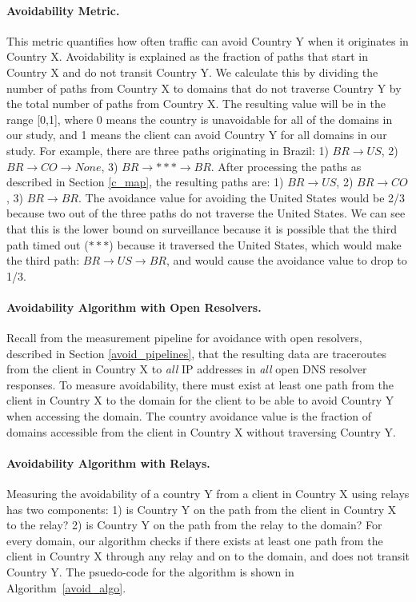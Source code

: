 \paragraph{Avoidability Metric.}  This metric quantifies how often traffic can avoid Country Y when it originates in Country X.  Avoidability is explained as the fraction of paths that start in Country X and do not transit Country Y.  We calculate this by dividing the number of paths from Country X to domains that do not traverse Country Y by the total number of paths from Country X. The resulting value will be in the range [0,1], where 0 means the country is unavoidable for all of the domains in our study, and 1 means the client can avoid Country Y for all domains in our study.  For example, there are three paths originating in Brazil: 1) $BR \rightarrow US$, 2) $BR \rightarrow CO \rightarrow None$, 3) $BR \rightarrow *** \rightarrow BR$.  After processing the paths as described in Section \ref{c_map}, the resulting paths are: 1) $BR \rightarrow US$, 2) $BR \rightarrow CO$, 3) $BR \rightarrow BR$.  The avoidance value for avoiding the United States would be 2/3 because two out of the three paths do not traverse the United States.  We can see that this is the lower bound on surveillance because it is possible that the third path timed out ($***$) because it traversed the United States, which would make the third path: $BR \rightarrow US \rightarrow BR$, and would cause the avoidance value to drop to 1/3.  

\paragraph{Avoidability Algorithm with Open Resolvers.} Recall from the measurement pipeline for avoidance with open resolvers, described in Section \ref{avoid_pipelines}, that the resulting data are traceroutes from the client in Country X to \textit{all} IP addresses in \textit{all} open DNS resolver responses.  To measure avoidability, there must exist at least one path from the client in Country X to the domain for the client to be able to avoid Country Y when accessing the domain.  The country avoidance value is the fraction of domains accessible from the client in Country X without traversing Country Y.

\paragraph{Avoidability Algorithm with Relays.}  Measuring the avoidability of a country Y from a client in Country X using relays has two components: 1) is Country Y on the path from the client in Country X to the relay?  2) is Country Y on the path from the relay to the domain?  For every domain, our algorithm checks if there exists at least one path from the client in Country X through any relay and on to the domain, and does not transit Country Y.  The psuedo-code for the algorithm is shown in Algorithm~\ref{avoid_algo}.

